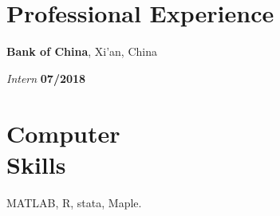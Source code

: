 \documentclass[margin,line]{res}
\newenvironment{list1}{
  \begin{list}{\ding{113}}{%
      \setlength{\itemsep}{0in}
      \setlength{\parsep}{0in} \setlength{\parskip}{0in}
      \setlength{\topsep}{0in} \setlength{\partopsep}{0in} 
      \setlength{\leftmargin}{0.17in}}}{\end{list}}
\begin{document}
\begin{resume}
\section{\sc Professional Experience}
{\bf Bank of China}, Xi'an, China

\vspace{-.3cm}
{\em Intern} \hfill {\bf 07/2018}\\

\section{\sc Computer \\ Skills}  MATLAB, R, stata, Maple.\\
%


\end{resume}
\end{document}
